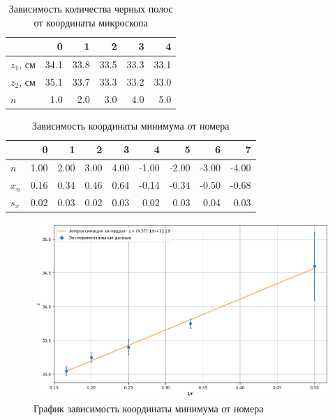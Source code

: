 \documentclass[12pt]{article}
\begin{document}
    \begin{table}[h!]
        \centering
        \caption{Зависимость количества черных полос от координаты микроскопа}
        \label{tab:1}
        \begin{tabular}{|l|rrrrr|}
            \hline
            {}        & 0    & 1    & 2    & 3    & 4    \\
            \hline
            $z_1$, см & 34.1 & 33.8 & 33.5 & 33.3 & 33.1 \\
            $z_2$, см & 35.1 & 33.7 & 33.3 & 33.2 & 33.0 \\
            $n$       & 1.0  & 2.0  & 3.0  & 4.0  & 5.0  \\
            \hline
        \end{tabular}
    \end{table}

    \begin{table}[h!]
        \centering
        \caption{Зависимость координаты минимума от номера}
        \label{tab:2}
        \begin{tabular}{|l|rrrrrrrr|}
            \hline
            {}    & 0    & 1    & 2    & 3    & 4     & 5     & 6     & 7     \\
            \hline
            $n$   & 1.00 & 2.00 & 3.00 & 4.00 & -1.00 & -2.00 & -3.00 & -4.00 \\
            $x_n$ & 0.16 & 0.34 & 0.46 & 0.64 & -0.14 & -0.34 & -0.50 & -0.68 \\
            $s_x$ & 0.02 & 0.03 & 0.02 & 0.03 & 0.02  & 0.03  & 0.04  & 0.03  \\
            \hline
        \end{tabular}
    \end{table}


    \begin{figure}[h!]
        \centering
        \includegraphics[width=\linewidth]{pic/A}
        \caption{График зависимость координаты минимума от номера}
        \label{fig:5}
    \end{figure}
\end{document}
